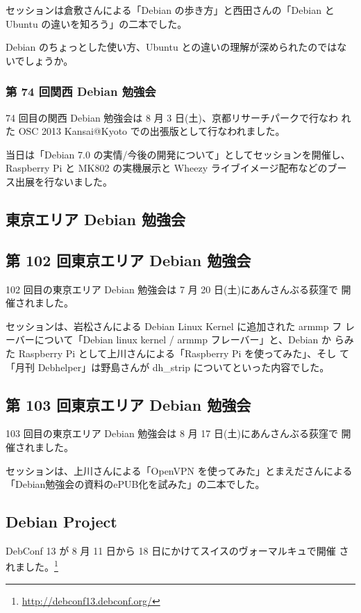 \documentclass[mingoth,a4paper]{jsarticle}
\begin{document}
セッションは倉敷さんによる「Debian の歩き方」と西田さんの「Debian と
Ubuntu の違いを知ろう」の二本でした。

Debian のちょっとした使い方、Ubuntu との違いの理解が深められたのではな
いでしょうか。

\subsubsection{第 74 回関西 Debian 勉強会}
74 回目の関西 Debian 勉強会は 8 月 3 日(土)、京都リサーチパークで行なわ
れた OSC 2013 Kansai@Kyoto での出張版として行なわれました。

当日は「Debian 7.0 の実情/今後の開発について」としてセッションを開催し、
Raspberry Pi と MK802 の実機展示と Wheezy ライブイメージ配布などのブー
ス出展を行ないました。

\subsection{東京エリア Debian 勉強会}
\subsection{第 102 回東京エリア Debian 勉強会}
102 回目の東京エリア Debian 勉強会は 7 月 20 日(土)にあんさんぶる荻窪で
開催されました。

セッションは、岩松さんによる Debian Linux Kernel に追加された armmp フ
レーバーについて「Debian linux kernel / armmp フレーバー」と、Debian か
らみた Raspberry Pi として上川さんによる「Raspberry Pi を使ってみた」、そし
て「月刊 Debhelper」は野島さんが dh\_strip についてといった内容でした。

\subsection{第 103 回東京エリア Debian 勉強会}
103 回目の東京エリア Debian 勉強会は 8 月 17 日(土)にあんさんぶる荻窪で
開催されました。

セッションは、上川さんによる「OpenVPN を使ってみた」とまえださんによる
「Debian勉強会の資料のePUB化を試みた」の二本でした。

\subsection{Debian Project}

DebConf 13 が 8 月 11 日から 18 日にかけてスイスのヴォーマルキュで開催
されました。\footnote{\url{http://debconf13.debconf.org/}}
\end{document}
